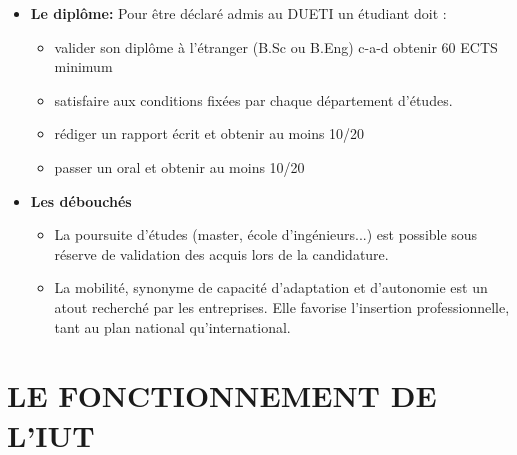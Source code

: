 \documentclass[11pt]{article}
\newcommand{\mysection}[1]
{
{
\setlength{\fboxsep}{0cm}
\noindent
\begin{minipage}{\linewidth}
\section{\large \textbf{#1}}
\vspace*{-10pt}
\end{minipage}\vspace*{10pt}
}
}
\begin{document}
\begin{itemize}
\item \textbf{Le diplôme: } Pour être déclaré admis au DUETI un étudiant doit :
\begin{itemize}
\item valider son diplôme à l'étranger (B.Sc ou B.Eng) c-a-d obtenir 60 ECTS minimum
\item satisfaire aux conditions fixées par chaque département d'études.
\item rédiger un rapport écrit et obtenir au moins 10/20
\item passer un oral et obtenir au moins 10/20
\end{itemize}

\item \textbf{Les débouchés}
\begin{itemize}
\item La poursuite d'études (master, école d'ingénieurs...) est possible sous réserve de validation des acquis lors de la candidature.
\item La mobilité, synonyme de capacité d'adaptation et d'autonomie est un atout recherché par les entreprises. Elle favorise l'insertion professionnelle, tant au plan national qu'international.
\end{itemize}
\end{itemize}


\newpage
\mysection{LE FONCTIONNEMENT DE L'IUT}
\end{document}
